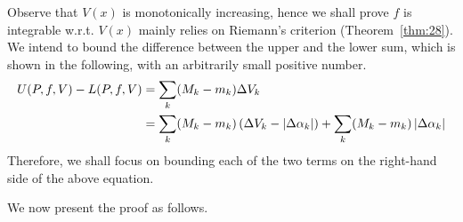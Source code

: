 \documentclass[thmcnt=section, 12pt]{my-elegantbook}
\begin{document}
Observe that $V(x)$ is monotonically increasing, hence we shall prove $f$ is integrable w.r.t. $V(x)$ mainly relies on Riemann's criterion (Theorem~\ref{thm:28}). We intend to bound the difference between the upper and the lower sum, which is shown in the following, with an arbitrarily small positive number.
\begin{align*}
    U(P,f,V) - L(P,f,V)
     & = \sum_k (M_k - m_k) \Delta V_k                                       \\
     & = \sum_k (M_k - m_k) \left( \Delta V_k - \left\lvert \Delta\alpha_k \right\rvert \right)
    + \sum_k (M_k - m_k) \left\lvert \Delta\alpha_k \right\rvert
\end{align*}
Therefore, we shall focus on bounding each of the two terms on the right-hand side of the above equation.

We now present the proof as follows.
\end{document}
